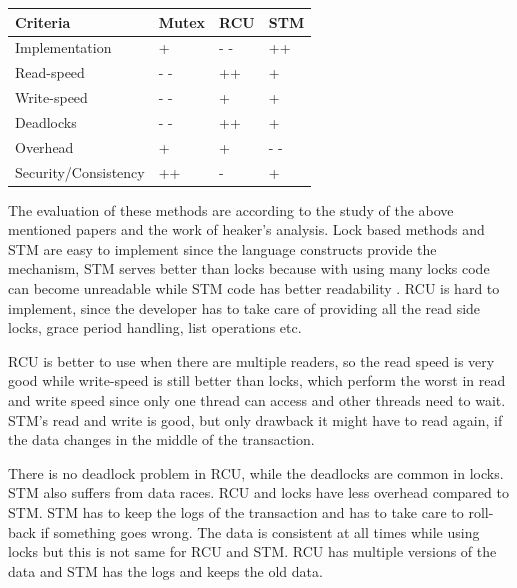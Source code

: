 \begin{center}
\begin{tabular}{|l|l|l|p{3cm}|}
\hline 
\textbf{Criteria} & \textbf{Mutex} & \textbf{RCU} & \textbf{STM} \\ \hline

Implementation & + & - - & ++ \\ \hline

Read-speed & - - & ++ & + \\ \hline

Write-speed & - - & + & + \\ \hline

Deadlocks & - - & ++ & + \\ \hline

Overhead & + & + & - - \\ \hline

Security/Consistency & ++ & - & + \\ \hline
\end{tabular}
\label{tab:lock}
\end{center}

The evaluation of these methods are according to the study of the above mentioned papers and the work of heaker's analysis. Lock based methods and STM are easy to implement since the language constructs provide the mechanism, STM serves better than locks because with using many locks code can become unreadable while STM code has better readability \cite{pankratius2014software}. RCU is hard to implement, since the developer has to take care of providing all the read side locks, grace period handling, list operations etc.

RCU is better to use when there are multiple readers, so the read speed is very good while write-speed is still better than locks, which perform the worst in read and write speed since only one thread can access and other threads need to wait. STM's read and write is good, but only drawback it might have to read again, if the data changes in the middle of the transaction.

There is no deadlock problem in RCU, while the deadlocks are common in locks. STM also suffers from data races. RCU and locks have less overhead compared to STM. STM has to keep the logs of the transaction and has to take care to roll-back if something goes wrong. The data is consistent at all times while using locks but this is not same for RCU and STM. RCU has multiple versions of the data and STM has the logs and keeps the old data.

